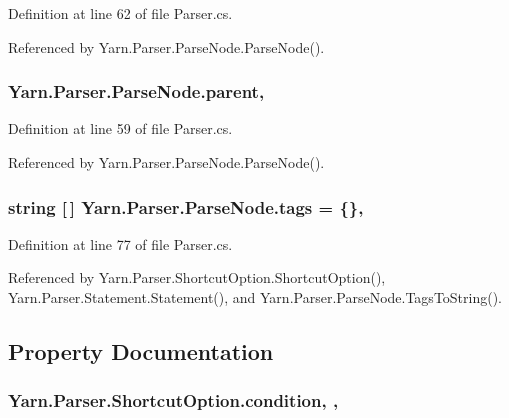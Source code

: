 Definition at line 62 of file Parser.\-cs.



Referenced by Yarn.\-Parser.\-Parse\-Node.\-Parse\-Node().

\hypertarget{a00150_af313a82103fcc2ff5a177dbb06b92f7b}{
\subsubsection[{parent}]{ Yarn.\-Parser.\-Parse\-Node.\-parent\hspace{0.3cm}{\ttfamily [package]}, {\ttfamily [inherited]}}}\label{a00150_af313a82103fcc2ff5a177dbb06b92f7b}


Definition at line 59 of file Parser.\-cs.



Referenced by Yarn.\-Parser.\-Parse\-Node.\-Parse\-Node().

\hypertarget{a00150_a58b3a15788fd2d4127d73619dc6d04ae}{
\subsubsection[{tags}]{\setlength{\rightskip}{0pt plus 5cm}string \mbox{[}$\,$\mbox{]} Yarn.\-Parser.\-Parse\-Node.\-tags = \{\}\hspace{0.3cm}{\ttfamily [package]}, {\ttfamily [inherited]}}}\label{a00150_a58b3a15788fd2d4127d73619dc6d04ae}


Definition at line 77 of file Parser.\-cs.



Referenced by Yarn.\-Parser.\-Shortcut\-Option.\-Shortcut\-Option(), Yarn.\-Parser.\-Statement.\-Statement(), and Yarn.\-Parser.\-Parse\-Node.\-Tags\-To\-String().



\subsection{Property Documentation}
\hypertarget{a00161_a31ece7f65af1e43961b68ba0275cdfaf}{
\subsubsection[{condition}]{ Yarn.\-Parser.\-Shortcut\-Option.\-condition\hspace{0.3cm}{\ttfamily [get]}, {\ttfamily [set]}, {\ttfamily [package]}}}\label{a00161_a31ece7f65af1e43961b68ba0275cdfaf}


